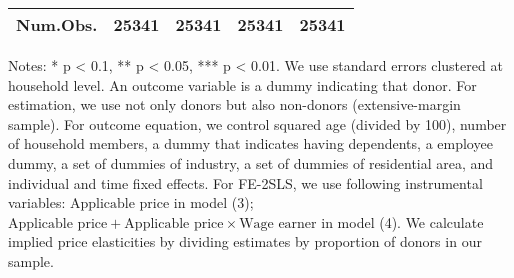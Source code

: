 \begin{table}
\begin{threeparttable}
\begin{tabular}[t]{l>{\centering\arraybackslash}p{7.5em}>{\centering\arraybackslash}p{7.5em}>{\centering\arraybackslash}p{7.5em}>{\centering\arraybackslash}p{7.5em}}
Num.Obs. & \num{25341} & \num{25341} & \num{25341} & \num{25341}\\
\bottomrule
\end{tabular}
\begin{tablenotes}
\item Notes: * p < 0.1, ** p < 0.05, *** p < 0.01. We use standard errors clustered at household level. An outcome variable is a dummy indicating that donor. For estimation, we use not only donors but also non-donors (extensive-margin sample). For outcome equation, we control squared age (divided by 100), number of household members, a dummy that indicates having dependents, a employee dummy, a set of dummies of industry, a set of dummies of residential area, and individual and time fixed effects. For FE-2SLS, we use following instrumental variables: $\text{Applicable price}$ in model (3); $\text{Applicable price} + \text{Applicable price} \times \text{Wage earner}$ in model (4). We calculate implied price elasticities by dividing estimates by proportion of donors in our sample.
\end{tablenotes}
\end{threeparttable}
\end{table}
